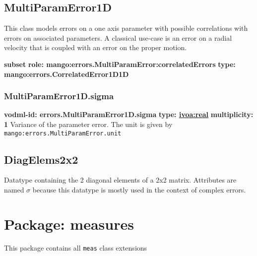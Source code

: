   \subsection{MultiParamError1D}
  \label{sect:errors.MultiParamError1D}
    This class models errors on a one axis parameter with possible correlations with errors on associated parameters. A classical use-case is an error on a radial velocity that is coupled with an error on the proper motion.

    \noindent \textbf{subset} \newline
    \indent   \textbf{role: mango:errors.MultiParamError:correlatedErrors} \newline
    \indent   \textbf{type: mango:errors.CorrelatedError1D1D} \newline


    \subsubsection{MultiParamError1D.sigma}
      \textbf{vodml-id: errors.MultiParamError1D.sigma} \newline
      \textbf{type: \hyperref[sect:ivoa]{ivoa:real}} \newline
      \textbf{multiplicity: 1} \newline 
      Variance of the parameter error. The unit is given by \texttt{mango:errors.MultiParamError.unit}

  \subsection{DiagElems2x2}
  \label{sect:errors.DiagElems2x2}
  Datatype containing the 2 diagonal elements of a 2x2 matrix. Attributes are named $\sigma$ because this datatype is mostly used in the context of complex errors.

\pagebreak
\section{Package: measures }


  This package contains all \texttt{meas} class extensions

